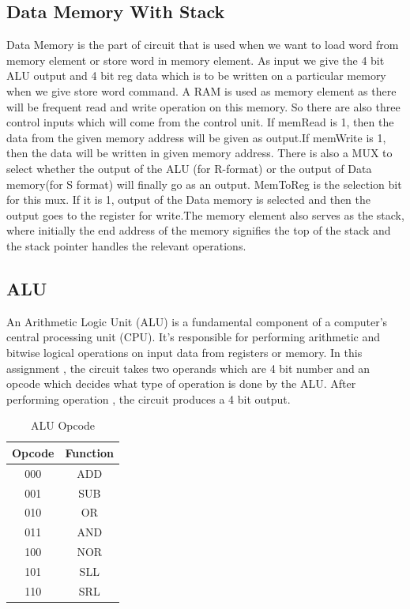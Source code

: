 \documentclass[12]{article}
\begin{document}
\subsection{Data Memory With Stack}
Data Memory is the part of circuit that is used when we want to load word from memory element or store word in memory element. As input we give the 4 bit ALU output and 4 bit reg data which is to be written on a particular memory when we give store word command. A RAM is used as memory element as there will be frequent read and write operation on this memory. So there are also three control inputs which will come from the control unit. If memRead is 1, then the data from the given memory address will be given as output.If memWrite is 1, then the data will be written in given memory address. There is also a MUX to select whether the output of the ALU (for R-format) or the output of Data memory(for S format) will finally go as an output. MemToReg is the selection bit for this mux. If it is 1, output of the Data memory is selected and then the output goes to the register for write.The memory element also serves as the stack, where initially the end address of the memory signifies the top of the stack and the stack pointer handles the relevant operations.


\subsection{ALU}
An Arithmetic Logic Unit (ALU) is a fundamental component of a computer's central processing unit (CPU). It's responsible for performing arithmetic and bitwise logical operations on input data from registers or memory. In this assignment , the circuit takes two operands which are 4 bit number and an opcode which decides what type of operation is done by the ALU. After performing operation , the circuit produces a 4 bit output. 

\begin{table}[!h]
    \centering
    \begin{tabular}{|c|c|}
\hline
Opcode & Function \\
\hline
000 & ADD \\
\hline
001 & SUB \\
\hline
010 & OR \\
\hline
011 & AND \\
\hline
100 & NOR \\
\hline
101 & SLL \\
\hline
110 & SRL \\
\hline
\end{tabular}
    \caption{ALU Opcode}
    \label{tab:my_label}
\end{table}
\end{document}
